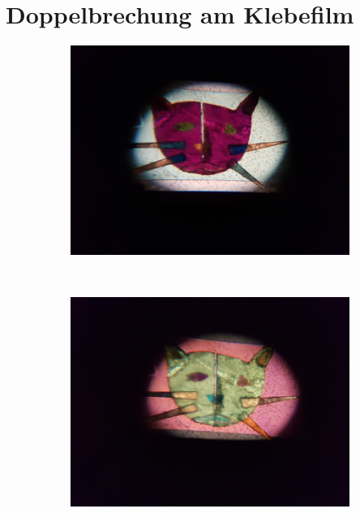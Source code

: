 \chapter{Doppelbrechung am Klebefilm}
\begin{figure}[tb]
	\begin{subfigure}{.3\textwidth}
		\centering
		\includegraphics[height=.8\linewidth]{./img/cat1.jpg}
		\label{subfig:cata}
	\end{subfigure}
	$\quad$
	\begin{subfigure}{.3\textwidth}
		\centering
		\includegraphics[height=.8\linewidth]{./img/cat2.jpg}

\end{subfigure}
\end{figure}
